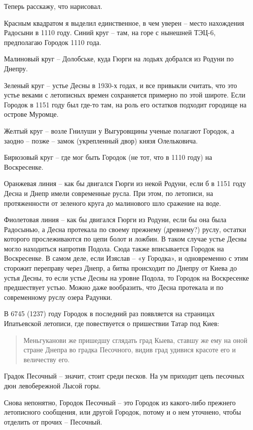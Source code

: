 Теперь расскажу, что нарисовал. 

Красным квадратом я выделил единственное, в чем уверен – место нахождения Радосыни в 1110 году. Синий круг – там, на горе с нынешней ТЭЦ-6, предполагаю Городок 1110 года.

Малиновый круг – Долобське, куда Гюрги на лодьях добрался из Родуни по Днепру.

Зеленый круг – устье Десны в 1930-х годах, и все привыкли считать, что это устье веками с летописных времен сохраняется примерно по этой широте. Если Городок в 1151 году был где-то там, на роль его остатков подходит городище на острове Муромце.

Желтый круг – возле Гнилуши у Выгуровщины ученые полагают Городок, а заодно – позже – замок (укрепленный двор) князя Олельковича.

Бирюзовый круг – где мог быть Городок (не тот, что в 1110 году) на Воскресенке.

Оранжевая линия – как бы двигался Гюрги из некой Родуни, если б в 1151 году Десна и Днепр имели современные русла. При этом, по летописи, на протяженности от зеленого круга до малинового шло сражение на воде.

Фиолетовая линия – как бы двигался Гюрги из Родуни, если бы она была Радосынью, а Десна протекала по своему прежнему (древнему?) руслу, остатки которого прослеживаются по цепи болот и ложбин. В таком случае устье Десны могло находиться напротив Подола. Сюда также вписывается Городок на Воскресенке. В самом деле, если Изяслав – «у Городка», и одновременно с этим сторожит переправу через Днепр, а битва происходит по Днепру от Киева до устья Десны, то если устье Десны на уровне Подола, то Городок на Воскресенке предшествует устью. Можно даже вообразить, что Десна протекала и по современному руслу озера Радунки.

В 6745 (1237) году Городок в последний раз появляется на страницах Ипатьевской летописи, где повествуется о пришествии Татар под Киев:

\begin{quotation}
Меньгуканови же пришедшу сглядать град Кыева, ставшу же ему на оной стране Днепра во градка Песочного, видив град удивися красоте его и величеству его.
\end{quotation}

Градок Песочный – значит, стоит среди песков. На ум приходит цепь песочных дюн левобережной Лысой горы.

Снова непонятно, Городок Песочный – это Городок из какого-либо прежнего летописного сообщения, или другой Городок, потому и о нем уточнено, чтобы отделить от прочих – Песочный.

